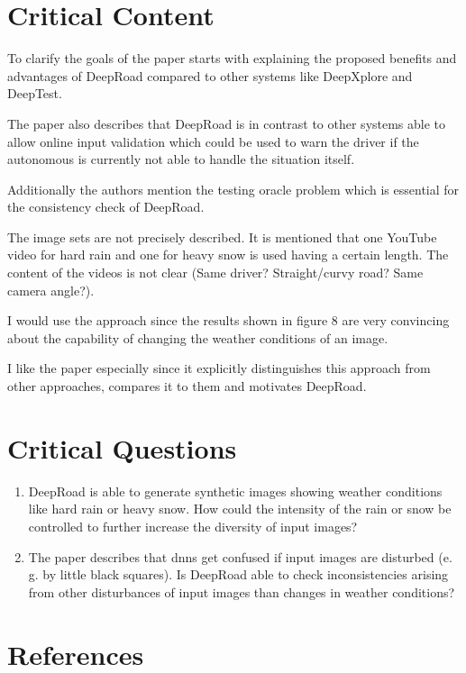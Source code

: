 \documentclass[oneside, notitlepage, twocolumn]{scrartcl}
\newcommand{\eg}{e.\,g.\xspace}
\begin{document}
\section{Critical Content}
To clarify the goals of the paper starts with explaining the proposed benefits and advantages of DeepRoad compared to other systems like DeepXplore and DeepTest.\par
The paper also describes that DeepRoad is in contrast to other systems able to allow online input validation which could be used to warn the driver if the autonomous is currently not able to handle the situation itself.\par
Additionally the authors mention the testing oracle problem which is essential for the consistency check of DeepRoad.\par
The image sets are not precisely described.
It is mentioned that one YouTube video for hard rain and one for heavy snow is used having a certain length.
The content of the videos is not clear (Same driver? Straight/curvy road? Same camera angle?).\par
I would use the approach since the results shown in figure 8 are very convincing about the capability of changing the weather conditions of an image.\par
I like the paper especially since it explicitly distinguishes this approach from other approaches, compares it to them and motivates DeepRoad.

\section{Critical Questions}
\begin{enumerate}
    \item DeepRoad is able to generate synthetic images showing weather conditions like hard rain or heavy snow.
        How could the intensity of the rain or snow be controlled to further increase the diversity of input images?
    \item The paper describes that \glspl{dnn} get confused if input images are disturbed (\eg{} by little black squares).
        Is DeepRoad able to check inconsistencies arising from other disturbances of input images than changes in weather conditions?
\end{enumerate}

\section{References}
\begingroup
\renewcommand{\section}[2]{}%
\nocite{*}
\printbibliography%
\endgroup
\end{document}
